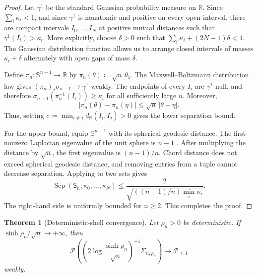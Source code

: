 \documentclass{amsart}
\numberwithin{equation}{section}
\theoremstyle{plain}
\newtheorem{thm}{Theorem}[section]
\theoremstyle{definition}
\theoremstyle{remark}
\newcommand{\R}{\mathbb{R}}
\newcommand{\Sph}{\mathbb{S}}
\newcommand{\Pyr}{\mathcal{P}}
\newcommand{\Ple}{\mathcal{P}_{\le 1}}
\DeclareMathOperator{\Sep}{Sep}
\begin{document}
\begin{proof}
	Let $\gamma^1$ be the standard Gaussian probability measure on $\R$.
	Since $\sum_i\kappa_i<1$, and since $\gamma^1$ is nonatomic and positive
	on every open interval, there are compact intervals
	$I_0,\ldots,I_N$ at positive mutual distances such that
	$\gamma^1(I_i)>\kappa_i$.  More explicitly, choose $\delta>0$ such that
	$\sum_i\kappa_i+(2N+1)\delta<1$.  The Gaussian distribution function
	allows us to arrange closed intervals of masses $\kappa_i+\delta$
	alternately with open gaps of mass $\delta$.

	Define $\pi_n\colon\Sph^{n-1}\to\R$ by
	$\pi_n(\theta)\coloneqq\sqrt n\,\theta_1$.  The Maxwell--Boltzmann
	distribution law \cite[Proposition~2.1]{shioya2016mmg} gives
	$(\pi_n)_*\sigma_{n-1}\to\gamma^1$ weakly.  The endpoints of every $I_i$
	are $\gamma^1$-null, and therefore
	$\sigma_{n-1}(\pi_n^{-1}(I_i))\ge\kappa_i$ for all sufficiently large
	$n$.  Moreover,
	\[
		|\pi_n(\theta)-\pi_n(\eta)|\le\sqrt n\,|\theta-\eta|.
	\]
	Thus, setting $c\coloneqq\min_{i\ne j}d_{\R}(I_i,I_j)>0$ gives the lower
	separation bound.

	For the upper bound, equip $\Sph^{n-1}$ with its spherical geodesic
	distance.  The first nonzero Laplacian eigenvalue of the unit sphere is
	$n-1$ \cite[Example~7.36]{shioya2016mmg}.  After multiplying the distance
	by $\sqrt n$, the first eigenvalue is $(n-1)/n$.  Chord distance does not
	exceed spherical geodesic distance, and removing entries from a tuple
	cannot decrease separation.  Applying
	\cite[Proposition~2.38]{shioya2016mmg} to two sets gives
\[ \Sep(\mathsf S_n;\kappa_0,\ldots,\kappa_N) \le\frac{2}{\sqrt{((n-1)/n)\min_i\kappa_i}}. \]
	The right-hand side is uniformly bounded for $n\ge2$.
	This completes the proof.
\end{proof}

\begin{thm}[Deterministic-shell convergence]
\label{thm:deterministic-shell-input}
	Let $\rho_n>0$ be deterministic.  If
	$\sinh\rho_n/\sqrt n\to+\infty$, then
	\begin{equation}\label{eq:deterministic-shell-input}
		\Pyr\left(
		\left(2\log\frac{\sinh\rho_n}{\sqrt n}\right)^{-1}
		\Sigma_{n,\rho_n}\right)
		\longrightarrow\Ple
	\end{equation}
	weakly.
\end{thm}
\end{document}

